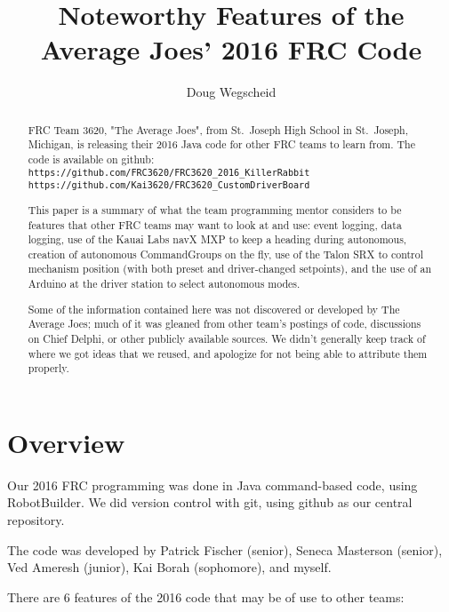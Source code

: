 \documentclass[]{article}
\title{Noteworthy Features of the Average Joes' 2016 FRC Code}
\author{Doug Wegscheid}
\begin{document}
\maketitle

\begin{abstract}

FRC Team 3620, "The Average Joes", from St.\ Joseph High School in St.\ Joseph, Michigan, is releasing their 2016 Java code for other FRC teams to learn from.
The code is available on github:
\\
\texttt{https://github.com/FRC3620/FRC3620\_2016\_KillerRabbit}
\\
\texttt{https://github.com/Kai3620/FRC3620\_CustomDriverBoard}

This paper is a summary of what the team programming mentor considers to be features that other FRC teams may want to look at and use: event logging, data logging, use of the Kauai Labs navX MXP to keep a heading during autonomous, creation of autonomous CommandGroups on the fly, use of the Talon SRX to control mechanism position (with both preset and driver-changed setpoints), and the use of an Arduino at the driver station to select autonomous modes.

Some of the information contained here was not discovered or developed by The Average Joes; much of it was gleaned from other team's postings of code, discussions on Chief Delphi, or other publicly available sources.
We didn't generally keep track of where we got ideas that we reused, and apologize for not being able to attribute them properly.

\end{abstract}

\section{Overview}

Our 2016 FRC programming was done in Java command-based code, using RobotBuilder.
We did version control with git, using github as our central repository.

The code was developed by Patrick Fischer (senior), Seneca Masterson (senior), Ved Ameresh (junior), Kai Borah (sophomore), and myself.

There are 6 features of the 2016 code that may be of use to other teams:
\end{document}
